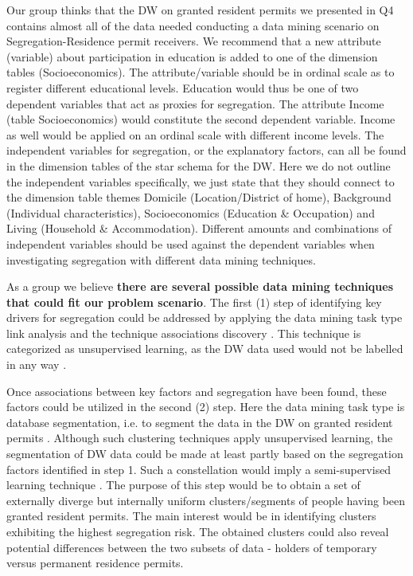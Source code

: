Our group thinks that the DW on granted resident permits we presented in Q4 contains almost all of the data needed conducting a data mining
scenario on Segregation-Residence permit receivers. 
We recommend that a new attribute (variable) about participation in education is added to one of the dimension tables (Socioeconomics). 
The attribute/variable should be in ordinal scale as to register different educational levels. 
Education would thus be one of two dependent variables that act as proxies for segregation. 
The attribute Income (table Socioeconomics) would constitute the second dependent variable. 
Income as well would be applied on an ordinal scale with different income levels. 
The independent variables for segregation, or the explanatory factors, 
can all be found in the dimension tables of the star schema for the DW. 
Here we do not outline the independent variables specifically, 
we just state that they should connect to the dimension table themes Domicile (Location/District of home), 
Background (Individual characteristics), Socioeconomics (Education \& Occupation) and Living (Household \& Accommodation).
Different amounts and combinations of independent variables should be used against the dependent variables when 
investigating segregation with different data mining techniques.  

As a group we believe \textbf{there are several possible data mining techniques that could fit our problem scenario}. 
The first (1) step of identifying key drivers for segregation could be addressed by applying the data mining task type link analysis and 
the technique associations discovery \cite[chapter~34.2]{CourseLitt}. 
This technique is categorized as unsupervised learning,
as the DW data used would not be labelled in any way \cite{l6video}.  

Once associations between key factors and segregation have been found, 
these factors could be utilized in the second (2) step. 
Here the data mining task type is database segmentation, 
i.e. to segment the data in the DW on granted resident permits \cite[chapter~34.2]{CourseLitt}. 
Although such clustering techniques apply unsupervised learning, 
the segmentation of DW data could be made at least partly based on the segregation factors identified in step 1. 
Such a constellation would imply a semi-supervised learning technique \cite{l6video}. 
The purpose of this step would be to obtain a set of externally diverge but 
internally uniform clusters/segments of people having been granted resident permits. 
The main interest would be in identifying clusters exhibiting the highest segregation risk. 
The obtained clusters could also reveal potential differences between the two subsets of data - 
holders of temporary versus permanent residence permits.  


